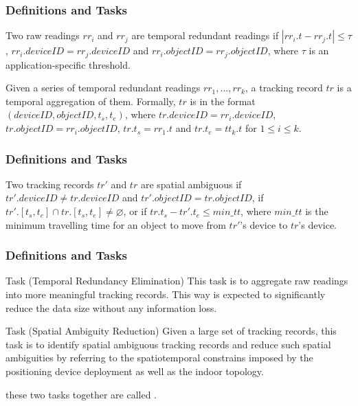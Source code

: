 
\begin{frame}
\frametitle{Definitions and Tasks}

\begin{definition}
  Two raw readings $rr_i$ and $rr_j$ are temporal redundant readings if $|rr_i.t - rr_j.t| \leq \tau$, $rr_i.deviceID = rr_j.deviceID$ and $rr_i.objectID = rr_j.objectID$, where $\tau$ is an application-specific threshold.
\end{definition}

\begin{definition}
  Given a series of temporal redundant readings $rr_1, ..., rr_k$, a tracking record $tr$ is a temporal aggregation of them. Formally, $tr$ is in the format $(deviceID, objectID, t_s, t_e)$, where $tr.deviceID = rr_i.deviceID$, $tr.objectID = rr_i.objectID$, $tr.t_s = rr_1.t$ and $tr.t_e = tt_k.t$ for $1 \leq i \leq k$.
\end{definition}

\end{frame}


\begin{frame}
\frametitle{Definitions and Tasks}

\begin{definition}
  Two tracking records $tr'$ and $tr$ are spatial ambiguous if $tr'.deviceID \neq tr.deviceID$ and $tr'.objectID = tr.objectID$, if $tr'.[t_s, t_e] \cap tr.[t_s, t_e] \neq \varnothing $, or if $tr.t_s - tr'.t_e \leq min\_tt$, where $min\_tt$ is the minimum travelling time for an object to move from $tr'$'s device to $tr$'s device.
\end{definition}

\end{frame}


\begin{frame}
\frametitle{Definitions and Tasks}

\begin{block}{Task (Temporal Redundancy Elimination)}
  This task is to aggregate raw readings into more meaningful tracking records. This way is expected to significantly reduce the data size without any information loss.
\end{block}

\begin{block}{Task (Spatial Ambiguity Reduction)}
  Given a large set of tracking records, this task is to identify spatial ambiguous tracking records and reduce such spatial ambiguities by referring to the spatiotemporal constrains imposed by the positioning device deployment as well as the indoor topology.
\end{block}

\textrm{these two tasks together are called }.

\end{frame}

